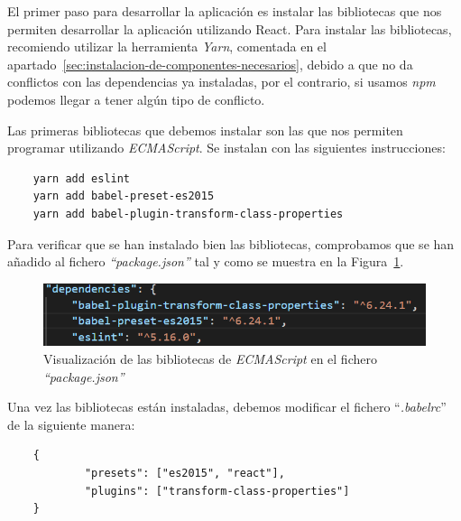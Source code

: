 \documentclass[a4paper, 12pt]{book}
\begin{document}
\vspace{5mm}
El primer paso para desarrollar la aplicación es instalar las bibliotecas que nos permiten desarrollar la aplicación utilizando React. Para instalar las bibliotecas, recomiendo utilizar la herramienta \textit{Yarn}, comentada en el apartado~\ref{sec:instalacion-de-componentes-necesarios}, debido a que no da conflictos con las dependencias ya instaladas, por el contrario, si usamos \textit{npm} podemos llegar a tener algún tipo de conflicto.

Las primeras bibliotecas que debemos instalar son las que nos permiten programar utilizando \textit{ECMAScript}. Se instalan con las siguientes instrucciones: 
\begin{verbatim}
    yarn add eslint
    yarn add babel-preset-es2015
    yarn add babel-plugin-transform-class-properties
\end{verbatim} 
Para verificar que se han instalado bien las bibliotecas, comprobamos que se han añadido al fichero \textit{``package.json''} tal y como se muestra en la Figura~\ref{fig:package_babelrc}.
\begin{figure}[h]
  \centering
  \includegraphics{img_usadas/package_babelrc.png}
  \caption{Visualización de las bibliotecas de \textit{ECMAScript} en el fichero \textit{``package.json''}}
  \label{fig:package_babelrc}
\end{figure}

Una vez las bibliotecas están instaladas, debemos modificar el fichero ``\textit{.babelrc}'' de la siguiente manera:
\begin{verbatim}
    {
	        "presets": ["es2015", "react"],
	        "plugins": ["transform-class-properties"]
    }
\end{verbatim}
\end{document}
